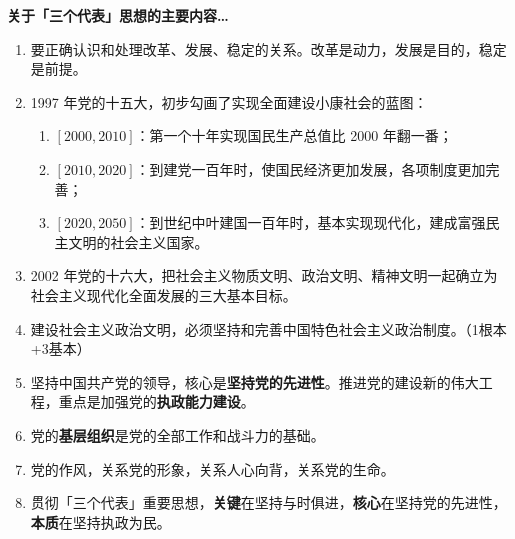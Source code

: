\documentclass[UTF8]{ctexart}
\newcommand\Emph[2]{\colorbox{c#1-light}{\textcolor{c#1-emph}{\textbf{#2}}}}
\begin{document}
\begin{mybox}{7}
\textbf{关于「三个代表」思想的主要内容…}
\begin{enumerate}
    \item 要正确认识和处理改革、发展、稳定的关系。改革是动力，发展是目的，稳定是前提。
    \item 1997 年党的十五大，初步勾画了实现全面建设小康社会的蓝图：
    \begin{enumerate}[label={\roman{enumii})}, start=1]
        \item $[2000,2010]$：第一个十年实现国民生产总值比 2000 年翻一番；
        \item $[2010,2020]$：到建党一百年时，使国民经济更加发展，各项制度更加完善；
        \item $[2020,2050]$：到世纪中叶建国一百年时，基本实现现代化，建成富强民主文明的社会主义国家。
    \end{enumerate}
    \item 2002 年党的十六大，把社会主义物质文明、政治文明、精神文明一起确立为社会主义现代化全面发展的三大基本目标。
    \item 建设社会主义政治文明，必须坚持和完善中国特色社会主义政治制度。（1根本+3基本）
    \item 坚持中国共产党的领导，核心是\Emph{7}{坚持党的先进性}。推进党的建设新的伟大工程，重点是加强党的\Emph{7}{执政能力建设}。
    \item 党的\Emph{7}{基层组织}是党的全部工作和战斗力的基础。
    \item 党的作风，关系党的形象，关系人心向背，关系党的生命。
    \item 贯彻「三个代表」重要思想，\Emph{7}{关键}在坚持与时俱进，\Emph{7}{核心}在坚持党的先进性，\Emph{7}{本质}在坚持执政为民。
\end{enumerate}
\end{mybox}

\newpage
{}
\BgThispage
\pagecolor{c8-med}
\end{document}
